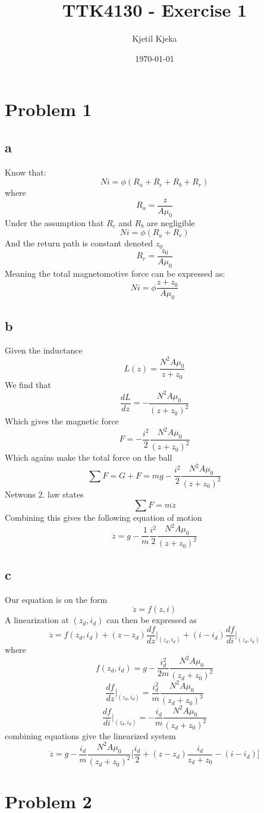 \documentclass[11pt]{article}
\author{Kjetil Kjeka}
\title{TTK4130 - Exercise 1}
\date{\today}
\begin{document}
\maketitle
\section*{Problem 1}
\subsection*{a}
Know that:
\[Ni = \phi (R_a + R_c + R_b + R_r) \]
where
\[R_a = \frac{z}{A \mu_0} \]
Under the assumption that $R_c$ and $R_b$ are negligible
\[Ni = \phi (R_a + R_r) \]
And the return path is constant denoted $z_0$
\[R_r = \frac{z_0}{A \mu_0}\]
Meaning the total magnetomotive force can be expressed as:
\[Ni = \phi \frac{z + z_0}{A \mu_0} \]

\subsection*{b}
Given the inductance
\[ L(z) = \frac{N^2 A \mu_0}{z + z_0}\]
We find that
\[ \frac{dL}{dz} = - \frac{N^2 A \mu_0}{(z + z_0)^2} \]
Which gives the magnetic force
\[ F = - \frac{i^2}{2} \frac{N^2 A \mu_0}{(z + z_0)^2} \]
Which agains make the total force on the ball
\[ \sum F = G + F = mg - \frac{i^2}{2} \frac{N^2 A \mu_0}{(z + z_0)^2} \]
Netwons 2. law states
\[ \sum F = m \ddot{z} \]
Combining this gives the following equation of motion
\[\ddot{z} = g - \frac{1}{m} \frac{i^2}{2} \frac{N^2 A \mu_0}{(z + z_0)^2} \]

\subsection*{c}
Our equation is on the form
\[\ddot{z} = f(z, i) \]
A linearization at $(z_d, i_d)$ can then be expressed as
\[\ddot{z} = f(z_d, i_d) + (z - z_d) \frac{df}{dz}\bigg|_{(z_d, i_d)} + (i - i_d) \frac{df}{di}\bigg|_{(z_d, i_d)} \]
where
\[f(z_d, i_d) = g - \frac{i_d^2}{2m} \frac{N^2 A \mu_0}{(z_d + z_0)^2} \]
\[\frac{df}{dz}\bigg|_{(z_d, i_d)} = \frac{i_d^2}{m} \frac{N^2 A \mu_0}{(z_d + z_0)^3} \]
\[\frac{df}{di}\bigg|_{(z_d, i_d)} = -\frac{i_d}{m} \frac{N^2 A \mu_0}{(z_d + z_0)^2} \]
combining equations give the linearized system
\[\ddot{z} = g - \frac{i_d}{m} \frac{N^2 A \mu_0}{(z_d + z_0)^2} \bigg[ \frac{i_d}{2} + (z-z_d)\frac{i_d}{z_d + z_0} - (i - i_d) \bigg] \]


\section*{Problem 2}
\end{document}
